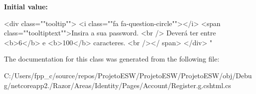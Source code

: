 {\bfseries Initial value\+:}
\begin{DoxyCode}

                <div \textcolor{keyword}{class}=\textcolor{stringliteral}{""}tooltip\textcolor{stringliteral}{""}>
                    <i \textcolor{keyword}{class}=\textcolor{stringliteral}{""}fa fa-question-circle\textcolor{stringliteral}{""}></i>
                    <span \textcolor{keyword}{class}=\textcolor{stringliteral}{""}tooltiptext\textcolor{stringliteral}{""}>Insira a sua password. <br />
                                                Deverá ter entre <b>6</b> e <b>100</b> caracteres. <br /></
      span>
                </div>
                \textcolor{stringliteral}{"}
\end{DoxyCode}


The documentation for this class was generated from the following file\+:\begin{DoxyCompactItemize}
\item 
C\+:/\+Users/fpp\+\_\+c/source/repos/\+Projeto\+E\+S\+W/\+Projeto\+E\+S\+W/\+Projeto\+E\+S\+W/obj/\+Debug/netcoreapp2./\+Razor/\+Areas/\+Identity/\+Pages/\+Account/Register.\+g.\+cshtml.\+cs\end{DoxyCompactItemize}
